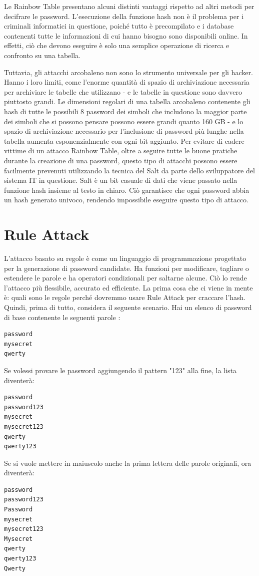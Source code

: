 Le Rainbow Table presentano alcuni distinti vantaggi rispetto ad altri metodi per decifrare le password. L'esecuzione della funzione hash non è il problema per i criminali informatici in questione, poiché tutto è precompilato e i database contenenti tutte le informazioni di cui hanno bisogno sono disponibili online. In effetti, ciò che devono eseguire è solo una semplice operazione di ricerca e confronto su una tabella.

Tuttavia, gli attacchi arcobaleno non sono lo strumento universale per gli hacker. Hanno i loro limiti, come l'enorme quantità di spazio di archiviazione necessaria per archiviare le tabelle che utilizzano - e le tabelle in questione sono davvero piuttosto grandi. Le dimensioni regolari di una tabella arcobaleno contenente gli hash di tutte le possibili 8 password dei simboli che includono la maggior parte dei simboli che si possono pensare possono essere grandi quanto 160 GB - e lo spazio di archiviazione necessario per l'inclusione di password più lunghe nella tabella aumenta esponenzialmente con ogni bit aggiunto.
Per evitare di cadere vittime di un attacco Rainbow Table, oltre a seguire tutte le buone pratiche durante la creazione di una password, questo tipo di attacchi possono essere facilmente prevenuti utilizzando la tecnica del Salt da parte dello sviluppatore del sistema IT in questione. Salt è un bit casuale di dati che viene passato nella funzione hash insieme al testo in chiaro. Ciò garantisce che ogni password abbia un hash generato univoco, rendendo impossibile eseguire questo tipo di attacco.

\section{Rule Attack}
L'attacco basato su regole\cite{Rule_based} è come un linguaggio di programmazione progettato per la generazione di password candidate. Ha funzioni per modificare, tagliare o estendere le parole e ha operatori condizionali per saltarne alcune. Ciò lo rende l'attacco più flessibile, accurato ed efficiente.
La prima cosa che ci viene in mente è: quali sono le regole perché dovremmo usare Rule Attack per craccare l'hash. Quindi, prima di tutto, considera il seguente scenario. Hai un elenco di password di base contenente le seguenti parole :

\begin{lstlisting}[caption={Esempio rule attack wordlist}, style=javaScriptCode]
password
mysecret
qwerty
\end{lstlisting}
Se volessi provare le password aggiungendo il pattern "123" alla fine, la lista diventerà:
\begin{lstlisting}[caption={Esempio rule attack wordlist}, style=javaScriptCode]
password
password123
mysecret
mysecret123
qwerty
qwerty123
\end{lstlisting}
Se si vuole mettere in maiuscolo anche la prima lettera delle parole originali, ora diventerà:
\begin{lstlisting}[caption={Esempio rule attack wordlist}, style=javaScriptCode]
password
password123
Password
mysecret
mysecret123
Mysecret
qwerty
qwerty123
Qwerty
\end{lstlisting}

